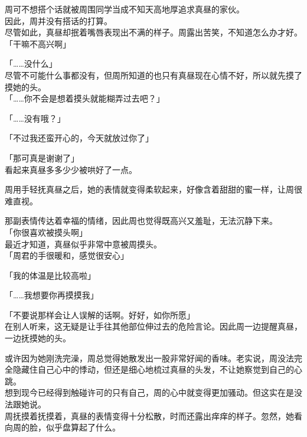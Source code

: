 周可不想搭个话就被周围同学当成不知天高地厚追求真昼的家伙。\\

因此，周并没有搭话的打算。\\

尽管如此，真昼却抿着嘴唇表现出不满的样子。周露出苦笑，不知道怎么办才好。\\

「干嘛不高兴啊」

「……没什么」\\

尽管不可能什么事都没有，但周所知道的也只有真昼现在心情不好，所以就先摸了摸她的头。\\

「……你不会是想着摸头就能糊弄过去吧？」

「……没有哦？」

「不过我还蛮开心的，今天就放过你了」

「那可真是谢谢了」\\

看起来真昼多多少少被哄好了一点。

周用手轻抚真昼之后，她的表情就变得柔软起来，好像含着甜甜的蜜一样，让周很难直视。

那副表情传达着幸福的情绪，因此周也觉得既高兴又羞耻，无法沉静下来。\\

「你很喜欢被摸头啊」\\

最近才知道，真昼似乎非常中意被周摸头。\\

「周君的手很暖和，感觉很安心」

「我的体温是比较高啦」

「……我想要你再摸摸我」

「不要说那样会让人误解的话啊。好好，如你所愿」\\

在别人听来，这无疑是让手往其他部位伸过去的危险言论。因此周一边提醒真昼，一边抚摸她的头。

或许因为她刚洗完澡，周总觉得她散发出一股非常好闻的香味。老实说，周没法完全隐藏住自己心中的悸动，但还是细心地梳过真昼的头发，不让她察觉到自己的心跳。\\

想到现今已经得到触碰许可的只有自己，周的心中就变得更加骚动。但这实在是没法跟她说。\\

周抚摸着抚摸着，真昼的表情变得十分松散，时而还露出痒痒的样子。忽然，她看向周的脸，似乎盘算起了什么。\\

